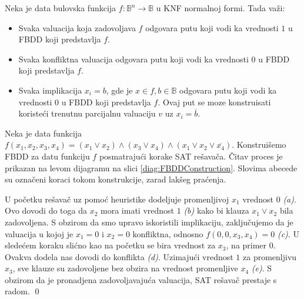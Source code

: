 \begin{obsn}
    Neka je data bulovska funkcija $f : \mathbb{B}^{n} \rightarrow \mathbb{B}$  u KNF normalnoj formi. Tada va\v{z}i:
    \begin{itemize}
        \item Svaka valuacija koja zadovoljava $f$ odgovara putu koji vodi ka vrednosti $1$ u FBDD koji predstavlja $f$.
        \item Svaka konfliktna valuacija odgovara putu koji vodi ka vrednosti $0$ u FBDD koji predstavlja $f$.
        \item Svaka implikacija $x_{i} = b$, gde je $x \in f, b \in \mathbb{B}$ odgovara putu koji vodi ka vrednosti $0$ u FBDD koji predstavlja $f$. Ovaj put se moze konstruisati koriste\'c{}i trenutnu parcijalnu valuaciju $v$ uz $x_{i} = \overline{b}$.
    \end{itemize}
\end{obsn}

\begin{exmp}
    Neka je data funkcija $f(x_{1}, x_{2}, x_{3}, x_{4}) = (x_{1} \vee x_{2}) \wedge (x_{3} \vee x_{4}) \wedge (x_{1} \vee x_{2} \vee \overline{x_{4}})$. Konstrui\v{s}emo FBDD za datu funkciju $f$ posmatraju\'c{}i korake SAT re\v{s}ava\v{c}a. \v{C}itav proces je prikazan na levom dijagramu na slici \ref{diag:FBDDConstruction}. Slovima abecede su ozna\v{c}eni koraci tokom konstrukcije, zarad lak\v{s}eg pra\'c{}enja.

    U po\v{c}etku re\v{s}ava\v{c} uz pomo\'c{} heuristike dodeljuje promenljivoj $x_{1}$ vrednost $0$ \textit{(a)}. Ovo dovodi do toga da $x_{2}$ mora imati vrednost $1$ \textit{(b)} kako bi klauza $x_{1} \vee x_{2}$ bila zadovoljena. S obzirom da smo upravo iskoristili implikaciju, zaklju\v{c}ujemo da je valuacija u kojoj je $x_{1} = 0$ i $x_{2} = 0$ konfliktna, odnosno $f(0, 0, x_{3}, x_{4}) = 0$ \textit{(c)}. U slede\'c{}em koraku sli\'c{}no kao na po\v{c}etku se bira vrednost za $x_{3}$, na primer $0$. Ovakva dodela nas dovodi do konflikta \textit{(d)}. Uzimaju\'c{}i vrednost $1$ za promenljivu $x_{3}$, sve klauze su zadovoljene bez obzira na vrednost promenljive $x_{4}$ \textit{(e)}. S obzirom da je pronadjena zadovoljavaju\'c{}a valuacija, SAT re\v{s}ava\v{c} prestaje s radom.
    \label{exmp:FBDDConstruction1}
    \qed
\end{exmp}

